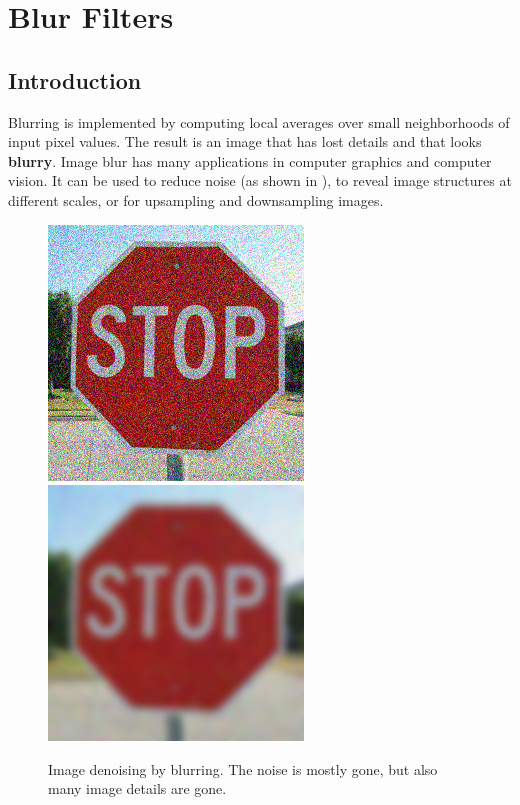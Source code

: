 
\chapter{Blur Filters}
\label{chap:blur_filters}




\section{Introduction}

Blurring is implemented by computing local averages over small neighborhoods of input pixel values. The result is an image that has lost details and that looks {\bf blurry}. Image blur has many applications in computer graphics and computer vision. It can be used to reduce noise (as shown in \fig{\ref{fig:stop_256_noise_3}}), to reveal image structures at different scales, or for upsampling and downsampling images.


\begin{figure}[h]
\centerline{
\includegraphics[width=.45\linewidth]{figures/blur_filters/stop_256_noise_3.jpg}~
\includegraphics[width=.45\linewidth]{figures/blur_filters/stop_256_blur_3.jpg}
}
\caption{Image denoising by blurring. The noise is mostly gone, but also many image details are gone.}
\label{fig:stop_256_noise_3}
\end{figure}


